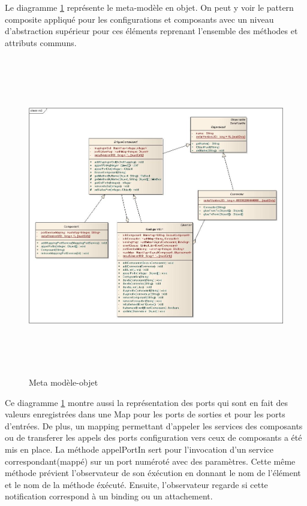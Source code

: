 \documentclass[11pt,a4paper]{article}
\begin{document}
\clearpage
Le diagramme \ref{Meta modèle-objet} représente le meta-modèle en objet. On peut
y voir le pattern composite appliqué pour les configurations et composants avec
un niveau d'abstraction supérieur pour ces éléments reprenant l'ensemble des
méthodes et attributs communs.


\begin{figure}[h]
  		\centering
  		\includegraphics[height=14cm,width=15cm]{m2impl.jpg}
  		\caption{Meta modèle-objet}
  		\label{Meta modèle-objet}
\end{figure}


Ce diagramme \ref{Meta modèle-objet} montre aussi la représentation des ports qui
sont en fait des valeurs enregistrées dans une Map pour les ports de sorties et
pour les ports d'entrées. De plus, un mapping permettant d'appeler les services
des composants ou de transferer les appels des ports configuration vers
ceux de composants a été mis en place. La méthode appelPortIn sert pour
l'invocation d'un service correspondant(mappé) sur un port numéroté avec des
paramètres. Cette même méthode prévient l'observateur de son éxécution en
donnant le nom de l'élément et le nom de la méthode éxécuté.
Ensuite, l'observateur regarde si cette notification correspond à un
binding ou un attachement.
\end{document}
